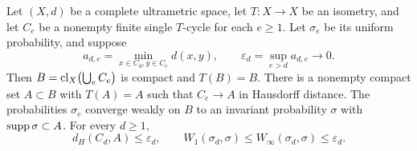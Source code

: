 \begin{proposition}
\label{prop:compact-limit}
Let $(X,d)$ be a complete ultrametric space, let $T:X\to X$ be an
isometry, and let $C_e$ be a nonempty finite single $T$-cycle for
each $e\ge1$. Let $\sigma_e$ be its uniform probability, and suppose
\begin{equation}\label{eq:contact-criterion}
 a_{d,e}=\min_{x\in C_d,y\in C_e}d(x,y),\qquad
 \varepsilon_d=\sup_{e>d}a_{d,e}\longrightarrow0.
\end{equation}
Then $B=\operatorname{cl}_X\bigl(\bigcup_e C_e\bigr)$ is compact and $T(B)=B$.
There is a nonempty compact set $A\subset B$ with $T(A)=A$ such that
$C_e\to A$ in Hausdorff distance. The probabilities $\sigma_e$
converge weakly on $B$ to an invariant probability $\sigma$ with
$\operatorname{supp}\sigma\subset A$. For every $d\ge1$,
\begin{equation}\label{eq:general-limit-bound}
 d_H(C_d,A)\le\varepsilon_d,\qquad
 W_1(\sigma_d,\sigma)\le W_\infty(\sigma_d,\sigma)
 \le\varepsilon_d.
\end{equation}
\end{proposition}
